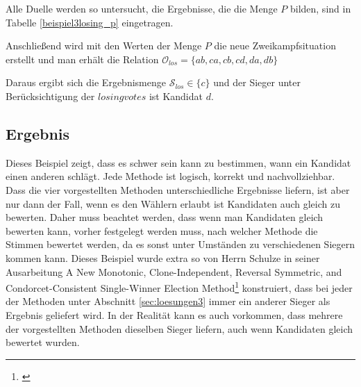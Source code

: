 Alle Duelle werden so untersucht, die Ergebnisse, die die Menge $P$ bilden, sind in Tabelle \ref{beispiel3losing_p} eingetragen.




Anschließend wird mit den Werten der Menge $P$ die neue Zweikampfsituation erstellt und man erhält die Relation $\mathcal{O}_{los} = \{ ab,ca,cb,cd,da,db \}$

Daraus ergibt sich die Ergebnismenge $\mathcal{S}_{los} \in \{c\}$ und der Sieger unter Berücksichtigung der $losing votes$ ist Kandidat $d$.

\newpage
\subsection{Ergebnis} 
\label{sec:ergebnis3}
Dieses Beispiel zeigt, dass es schwer sein kann zu bestimmen, wann ein Kandidat einen anderen schlägt. Jede Methode ist logisch, korrekt und nachvollziehbar. Dass die vier vorgestellten Methoden unterschiedliche Ergebnisse liefern, ist aber nur dann der Fall, wenn es den Wählern erlaubt ist Kandidaten auch gleich zu bewerten. Daher muss beachtet werden, dass wenn man Kandidaten gleich bewerten kann, vorher festgelegt werden muss, nach welcher Methode die Stimmen bewertet werden, da es sonst unter Umständen zu verschiedenen Siegern kommen kann. Dieses Beispiel wurde extra so von Herrn Schulze in seiner Ausarbeitung \glqq A New Monotonic, Clone-Independent,
Reversal Symmetric, and Condorcet-Consistent
Single-Winner Election Method\grqq{}\footnote{\Vgl \citet{Schulze2017}} konstruiert, dass bei jeder der Methoden unter Abschnitt \ref{sec:loesungen3} immer ein anderer Sieger als Ergebnis geliefert wird. In der Realität kann es auch vorkommen, dass mehrere der vorgestellten Methoden dieselben Sieger liefern, auch wenn Kandidaten gleich bewertet wurden.
\newpage